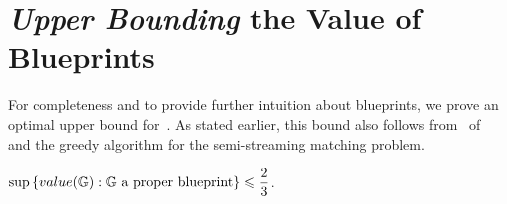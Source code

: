 
\section{\emph{Upper Bounding} the Value of Blueprints}\label{app:2-3-upper}

For completeness and to provide further intuition about blueprints, we prove an optimal upper bound for~. As stated earlier, this bound also follows from~ of~\cite{AssadiJX26} and the greedy algorithm for the semi-streaming
matching problem. 

\begin{lemma}\label{thm:value-2/3}
	$\sup\left\{ value(\mathbb{G}):\text{$\mathbb{G}$ a proper blueprint} \right\} \leqslant \dfrac23$. 
\end{lemma}


